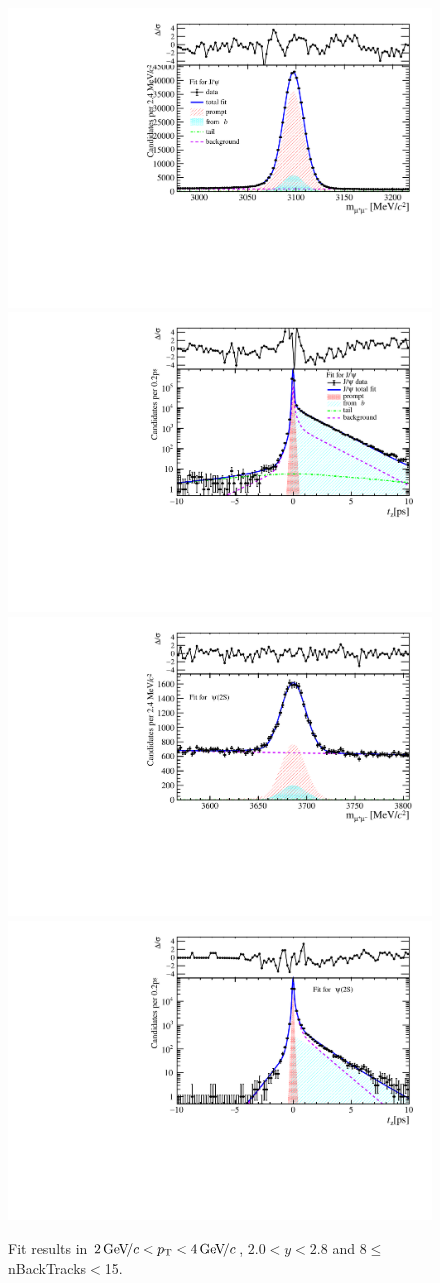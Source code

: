 \begin{figure}[H]
\begin{center}
\includegraphics[width=0.47\linewidth]{pdf/Jpsi/drawmassB/n2y1pt2.pdf}
\includegraphics[width=0.47\linewidth]{pdf/Jpsi/2DFitB/n2y1pt2.pdf}
\vspace*{-0.5cm}
\includegraphics[width=0.47\linewidth]{pdf/Psi2S/drawmassB/n2y1pt2.pdf}
\includegraphics[width=0.47\linewidth]{pdf/Psi2S/2DFitB/n2y1pt2.pdf}
\vspace*{-0.5cm}
\end{center}
\caption{Fit results in $2\text{\,Ge\kern -0.1em V\!/}c<p_{\mathrm{T}}<4\text{\,Ge\kern -0.1em V\!/}c$, $2.0<y<2.8$ and 8$\leq$nBackTracks$<$15.}
\label{Fitn2y1pt2}
\end{figure}

